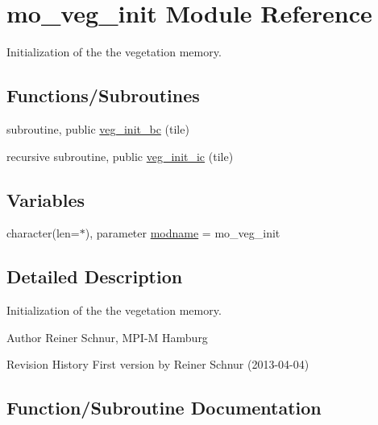 \hypertarget{namespacemo__veg__init}{}\section{mo\+\_\+veg\+\_\+init Module Reference}
\label{namespacemo__veg__init}


Initialization of the the vegetation memory.  


\subsection*{Functions/\+Subroutines}
\begin{DoxyCompactItemize}
\item 
subroutine, public \hyperlink{namespacemo__veg__init_a51acdbb676d276054d328e045605f688}{veg\+\_\+init\+\_\+bc} (tile)
\item 
recursive subroutine, public \hyperlink{namespacemo__veg__init_a1f3c0830f53331836f61d9ed195747ae}{veg\+\_\+init\+\_\+ic} (tile)
\end{DoxyCompactItemize}
\subsection*{Variables}
\begin{DoxyCompactItemize}
\item 
character(len=$\ast$), parameter \hyperlink{namespacemo__veg__init_a29fc1d9443f5600fe324d7f02b8c3dbf}{modname} = \textquotesingle{}mo\+\_\+veg\+\_\+init\textquotesingle{}
\end{DoxyCompactItemize}


\subsection{Detailed Description}
Initialization of the the vegetation memory. 

\begin{DoxyAuthor}{Author}
Reiner Schnur, M\+P\+I-\/\+M Hamburg
\end{DoxyAuthor}
\begin{DoxyParagraph}{Revision History}
First version by Reiner Schnur (2013-\/04-\/04) 
\end{DoxyParagraph}


\subsection{Function/\+Subroutine Documentation}
\hypertarget{namespacemo__veg__init_a51acdbb676d276054d328e045605f688}{}
